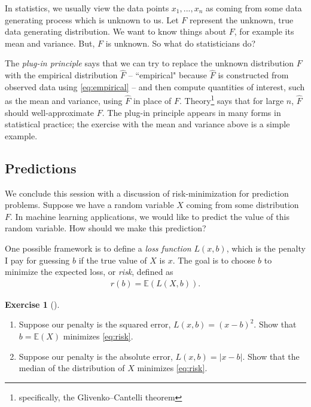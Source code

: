 \documentclass[11pt]{article}
\theoremstyle{definition}
\newtheorem{exercise}[]{Exercise}
\newcommand{\E}{\mathbb{E}}
\begin{document}
In statistics, we usually view the data points $x_1, ..., x_n$ as coming from some
data generating process which is unknown to us. Let $F$ represent the unknown, true
data generating distribution. We want to know things about $F$, for example its mean
and variance.
But, $F$ is unknown. So what do statisticians do?

The \textit{plug-in principle} says that we can try to replace the unknown
distribution $F$ with the empirical distribution $\hat F$ -- ``empirical" because
$\hat F$ is constructed from observed data using
\eqref{eq:empirical} -- and then compute quantities of interest,
such as the mean and variance,
using $\hat F$ in place of $F$.
Theory\footnote{specifically, the Glivenko–Cantelli theorem}
says that for large $n$, $\hat F$ should well-approximate $F$.
The plug-in principle
appears in many forms in statistical practice; the exercise with the mean and variance above
is a simple example.

\subsection{Predictions}

We conclude this session with a discussion of risk-minimization for prediction problems.
Suppose we have a random variable $X$ coming from some distribution $F$.
In machine learning applications, we would like to predict the value of this random variable.
How should we make this prediction?

One possible framework is to define a \textit{loss function} $L(x, b)$, which is
the penalty I pay for guessing $b$ if the true value of $X$ is $x$.
The goal is to choose $b$ to minimize the expected loss, or \textit{risk}, defined as
\begin{align}
  r(b) = \E(L(X, b)).
  \label{eq:risk}
\end{align}

\begin{exercise}[]
  $\quad$\vspace{-1em}

  \begin{enumerate}[label = (\alph*)]
    \item Suppose our penalty is the squared error, $L(x, b) = (x - b)^2$. Show that $b = \E(X)$ minimizes
    \eqref{eq:risk}.
    \item Suppose our penalty is the absolute error, $L(x, b) = |x - b|$. Show that the median of the
    distribution of $X$ minimizes \eqref{eq:risk}.
  \end{enumerate}
\end{exercise}
\end{document}
